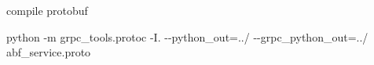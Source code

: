 compile protobuf

{\ttfamily python -\/m grpc\+\_\+tools.\+protoc -\/I. -\/-\/python\+\_\+out=../ -\/-\/grpc\+\_\+python\+\_\+out=../ abf\+\_\+service.\+proto} 